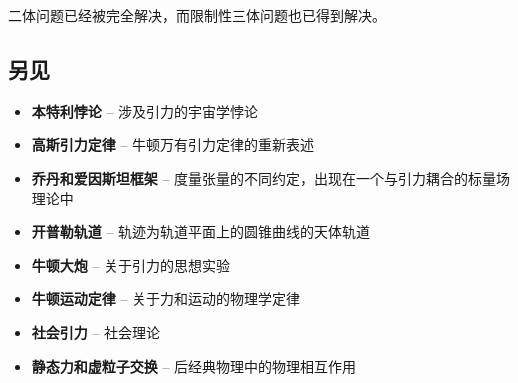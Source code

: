 二体问题已经被完全解决，而限制性三体问题也已得到解决。
\subsection{另见}
\begin{itemize}
\item \textbf{本特利悖论} – 涉及引力的宇宙学悖论
\item \textbf{高斯引力定律} – 牛顿万有引力定律的重新表述
\item \textbf{乔丹和爱因斯坦框架} – 度量张量的不同约定，出现在一个与引力耦合的标量场理论中
\item \textbf{开普勒轨道} – 轨迹为轨道平面上的圆锥曲线的天体轨道
\item \textbf{牛顿大炮} – 关于引力的思想实验
\item \textbf{牛顿运动定律} – 关于力和运动的物理学定律
\item \textbf{社会引力} – 社会理论
\item \textbf{静态力和虚粒子交换} – 后经典物理中的物理相互作用
\end{itemize}
